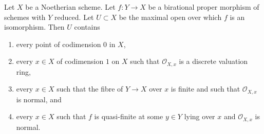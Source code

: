 \begin{lemma}
\label{lemma-modification-normal-iso-over-codimension-1}
Let $X$ be a Noetherian scheme. Let $f : Y \to X$ be a birational proper
morphism of schemes with $Y$ reduced. Let $U \subset X$ be the
maximal open over which $f$ is an isomorphism. Then $U$ contains
\begin{enumerate}
\item every point of codimension $0$ in $X$,
\item every $x \in X$ of codimension $1$ on $X$ such that
$\mathcal{O}_{X, x}$ is a discrete valuation ring,
\item every $x \in X$ such that the fibre of $Y \to X$ over $x$ is
finite and such that $\mathcal{O}_{X, x}$ is normal, and
\item every $x \in X$ such that $f$ is quasi-finite at some
$y \in Y$ lying over $x$ and $\mathcal{O}_{X, x}$ is normal.
\end{enumerate}
\end{lemma}

